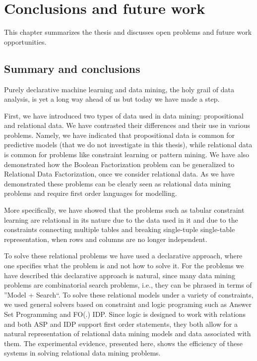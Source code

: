 \chapter{Conclusions and future work}\label{ch:conclusions}
\begin{addmargin}[2em]{2em}
This chapter summarizes the thesis and discusses open problems and
future work opportunities.
\end{addmargin}

\section{Summary and conclusions}
Purely declarative machine learning and data mining, the holy grail of
data analysis, is yet a long way ahead of us but today we
have made a step.

First, we have introduced two types of data used in data mining:
propositional and relational data. We have contrasted their
differences and their use in various problems. Namely, we have
indicated that propositional data is common for predictive models (that
we do not investigate in this thesis), while relational data is common
for problems like constraint learning or pattern mining. We have also
demonstrated how the Boolean Factorization problem can be generalized
to Relational Data Factorization, once we consider relational data.
As we have demonstrated these problems can be clearly seen as
relational data mining problems and require first order languages for
modelling.

More specifically, we have showed that the problems such as tabular
constraint learning are relational in its nature due to the data used
in it and due to the constraints connecting multiple tables and
breaking single-tuple single-table representation, when rows and
columns are no longer independent.

To solve these relational problems we have used a declarative approach,
where one specifies what the problem is and not how to solve it. For
the problems we have described this declarative approach is natural, since many
data mining problems are combinatorial search problems, i.e., they
can be phrased in terms of ''Model + Search``. To solve these relational
models under a variety of constraints, we used general solvers based
on constraint and logic programing such as Answer Set Programming and
FO(.) IDP. Since logic is designed to work with relations and both ASP
and IDP support first order statements, they both allow for a natural
representation of relational data mining models and data associated
with them. The experimental evidence, presented here,
shows the efficiency of
these systems in solving relational data mining problems.

